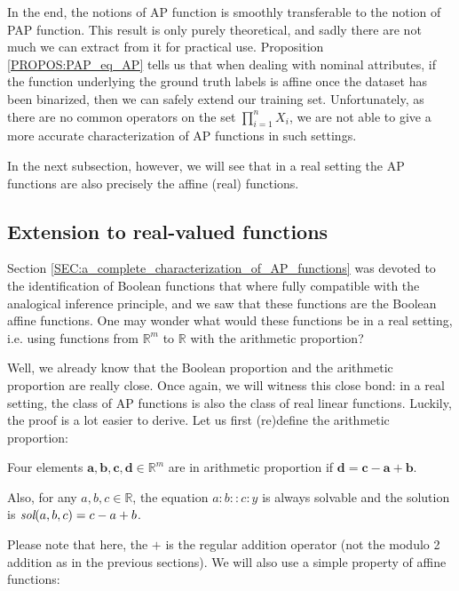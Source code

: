 In the end, the notions of AP function is smoothly transferable to the notion
of PAP function. This result is only purely theoretical, and sadly there are
not much we can extract from it for practical use. Proposition
\ref{PROPOS:PAP_eq_AP} tells us that when dealing with nominal attributes, if
the function underlying the ground truth labels is affine once the dataset has
been binarized, then we can safely extend our training set. Unfortunately, as
there are no common operators on the set  $\prod_{i=1}^n X_i$, we are not able
to give a more accurate characterization of AP functions in such settings.

In the next subsection, however, we will see that in a real setting the AP
functions are also precisely the affine (real) functions.

\subsection{Extension to real-valued functions}
\label{SEC:extension_to_real_valued_functions}

Section \ref{SEC:a_complete_characterization_of_AP_functions} was devoted to the
identification of Boolean functions that where fully compatible with the
analogical inference principle, and we saw that
these functions are the Boolean affine functions. One may wonder what would
these functions be in a real setting, i.e. using functions  from $\mathbb{R}^m$
to $\mathbb{R}$ with the arithmetic proportion?

Well, we already know that the Boolean proportion and the arithmetic proportion
are really close. Once again, we will witness this close bond: in a real
setting, the class of AP functions is also the class of real linear functions.
Luckily, the proof is a lot easier to derive.  Let us first (re)define the
arithmetic proportion:
\begin{property}
  \label{PROPER:sol_arithm_prop}
  Four elements $\mathbf{a}, \mathbf{b}, \mathbf{c}, \mathbf{d} \in
  \mathbb{R}^m$ are in arithmetic proportion if $\mathbf{d} = \mathbf{c} -
  \mathbf{a} + \mathbf{b}$.

  Also, for any $a, b, c \in \mathbb{R}$, the equation $a : b :: c:y$ is always
  solvable and the solution is $\emph{sol}(a, b, c) = c - a + b$.
\end{property}

Please note that here, the $+$ is the regular addition operator (not the modulo
2 addition as in the previous sections). We will also use a simple property of
affine functions:

